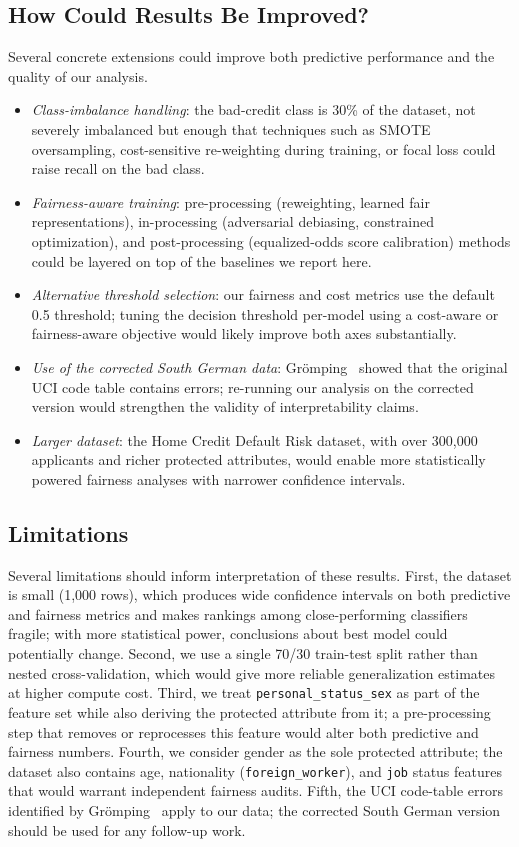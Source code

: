 \documentclass[conference]{IEEEtran}
\begin{document}
\subsection{How Could Results Be Improved?}
Several concrete extensions could improve both predictive performance and the quality of our analysis.
\begin{itemize}
    \item \emph{Class-imbalance handling}: the bad-credit class is 30\% of the dataset, not severely imbalanced but enough that techniques such as SMOTE oversampling, cost-sensitive re-weighting during training, or focal loss could raise recall on the bad class.
    \item \emph{Fairness-aware training}: pre-processing (reweighting, learned fair representations), in-processing (adversarial debiasing, constrained optimization), and post-processing (equalized-odds score calibration) methods could be layered on top of the baselines we report here.
    \item \emph{Alternative threshold selection}: our fairness and cost metrics use the default 0.5 threshold; tuning the decision threshold per-model using a cost-aware or fairness-aware objective would likely improve both axes substantially.
    \item \emph{Use of the corrected South German data}: Gr\"omping~\cite{groemping_south_german} showed that the original UCI code table contains errors; re-running our analysis on the corrected version would strengthen the validity of interpretability claims.
    \item \emph{Larger dataset}: the Home Credit Default Risk dataset, with over 300{,}000 applicants and richer protected attributes, would enable more statistically powered fairness analyses with narrower confidence intervals.
\end{itemize}

\subsection{Limitations}
Several limitations should inform interpretation of these results. First, the dataset is small (1{,}000 rows), which produces wide confidence intervals on both predictive and fairness metrics and makes rankings among close-performing classifiers fragile; with more statistical power, conclusions about best model could potentially change. Second, we use a single 70/30 train-test split rather than nested cross-validation, which would give more reliable generalization estimates at higher compute cost. Third, we treat \texttt{personal\_status\_sex} as part of the feature set while also deriving the protected attribute from it; a pre-processing step that removes or reprocesses this feature would alter both predictive and fairness numbers. Fourth, we consider gender as the sole protected attribute; the dataset also contains age, nationality (\texttt{foreign\_worker}), and \texttt{job} status features that would warrant independent fairness audits. Fifth, the UCI code-table errors identified by Gr\"omping~\cite{groemping_south_german} apply to our data; the corrected South German version should be used for any follow-up work.
\end{document}
